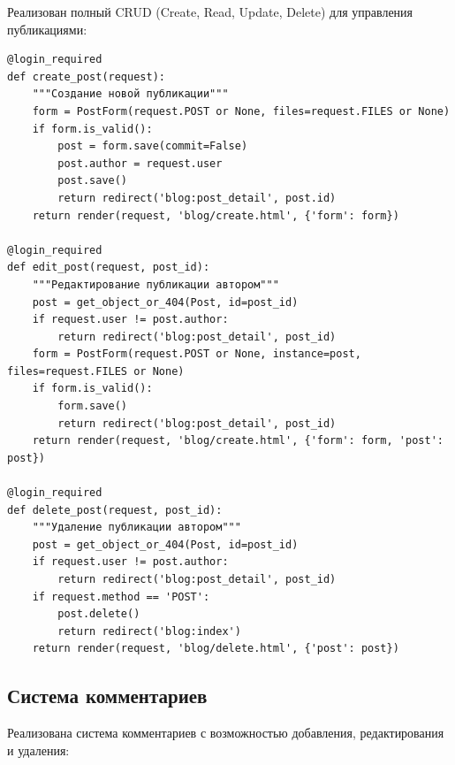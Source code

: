 \documentclass[pract,och,bachelor]{SCWorks}
\begin{document}
Реализован полный CRUD (Create, Read, Update, Delete) для управления публикациями:

\begin{listing}[H]
\begin{verbatim}
@login_required
def create_post(request):
    """Создание новой публикации"""
    form = PostForm(request.POST or None, files=request.FILES or None)
    if form.is_valid():
        post = form.save(commit=False)
        post.author = request.user
        post.save()
        return redirect('blog:post_detail', post.id)
    return render(request, 'blog/create.html', {'form': form})

@login_required
def edit_post(request, post_id):
    """Редактирование публикации автором"""
    post = get_object_or_404(Post, id=post_id)
    if request.user != post.author:
        return redirect('blog:post_detail', post_id)
    form = PostForm(request.POST or None, instance=post, files=request.FILES or None)
    if form.is_valid():
        form.save()
        return redirect('blog:post_detail', post_id)
    return render(request, 'blog/create.html', {'form': form, 'post': post})

@login_required
def delete_post(request, post_id):
    """Удаление публикации автором"""
    post = get_object_or_404(Post, id=post_id)
    if request.user != post.author:
        return redirect('blog:post_detail', post_id)
    if request.method == 'POST':
        post.delete()
        return redirect('blog:index')
    return render(request, 'blog/delete.html', {'post': post})
\end{verbatim}
\caption{CRUD-операции для публикаций}
\end{listing}

\subsection{Система комментариев}

Реализована система комментариев с возможностью добавления, редактирования и удаления:
\end{document}

